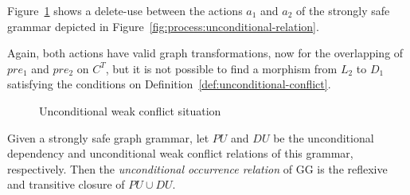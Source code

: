 \begin{example} Figure~\ref{fig:process:unconditional-relation:conflict} shows a delete-use between the actions $a_1$ and $a_2$ of the strongly safe grammar depicted in Figure~\ref{fig:process:unconditional-relation}.

  Again, both actions have valid graph transformations, now for the overlapping of $pre_1$ and $pre_2$ on $C^T$, but it is not possible to find a morphism from $L_2$ to $D_1$ satisfying the conditions on Definition~\ref{def:unconditional-conflict}.
\begin{figure}[!ht]
  \centering
  \caption{Unconditional weak conflict situation}\label{fig:process:unconditional-relation:conflict}
\end{figure}
\end{example}

\begin{definition} Given \doublyTypedGraphGrammarCore{} a strongly safe graph grammar, let $PU$ and $DU$ be the unconditional dependency and unconditional weak conflict relations of this grammar, respectively. Then the \emph{unconditional occurrence relation} of GG is the reflexive and transitive closure of \mbox{$PU \cup DU$}.
\end{definition}

